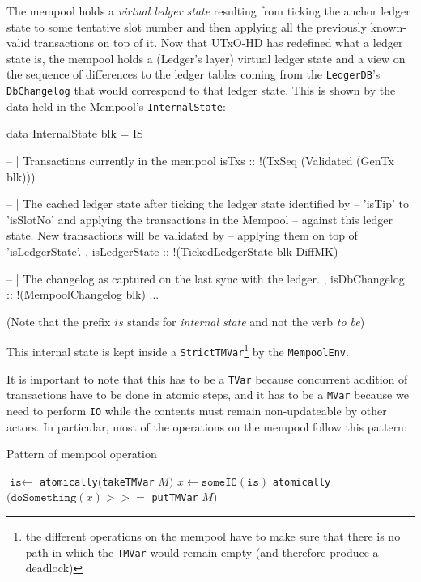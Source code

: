 \documentclass[11pt,a4paper]{article}
\newcommand{\htt}[1]{\texttt{#1}}
\theoremstyle{definition}
\let\getss\gets
\renewcommand*{\gets}{\coloneqq}
\begin{document}
The mempool holds a \emph{virtual ledger state} resulting from ticking the
anchor ledger state to some tentative slot number and then applying all the
previously known-valid transactions on top of it. Now that UTxO-HD has redefined
what a ledger state is, the mempool holds a (Ledger's layer) virtual ledger
state and a view on the sequence of differences to the ledger tables coming from
the \htt{LedgerDB}'s \htt{DbChangelog} that would correspond to that ledger
state. This is shown by the data held in the Mempool's \htt{InternalState}:

\begin{code}
data InternalState blk = IS {
   -- | Transactions currently in the mempool
   isTxs          :: !(TxSeq (Validated (GenTx blk)))

   -- | The cached ledger state after ticking the ledger state identified by
   -- 'isTip' to 'isSlotNo' and applying the transactions in the Mempool
   -- against this ledger state. New transactions will be validated by
   -- applying them on top of 'isLedgerState'.
 , isLedgerState  :: !(TickedLedgerState blk DiffMK)

   -- | The changelog as captured on the last sync with the ledger.
 , isDbChangelog  :: !(MempoolChangelog blk)
   ...
}
\end{code}

(Note that the prefix $is$ stands for \emph{internal state} and not the verb \emph{to be})

This internal state is kept inside a \htt{StrictTMVar}\footnote{the different operations on the mempool have to make
sure that there is no path in which the \htt{TMVar} would remain empty (and
therefore produce a deadlock)} by the
\htt{MempoolEnv}.

It is important to note that this has to be a \htt{TVar} because concurrent
addition of transactions have to be done in atomic steps, and it has to be a
\htt{MVar} because we need to perform \htt{IO} while the contents must
remain non-updateable by other actors. In particular, most of the operations on
the mempool follow this pattern:

\begin{algorithm}
  \caption{Pattern of mempool operation}
  \begin{algorithmic}[1]
    \Procedure{MempoolOp}{$M :: $ \htt{Mempool}}
    \State $\texttt{is} \getss$ \htt{atomically}$($\htt{takeTMVar} $M)$
    \State $x \getss \texttt{someIO}(\texttt{is})$
    \State \htt{atomically}$(\texttt{doSomething}(x) >>=$ \htt{putTMVar} $M)$
    \EndProcedure
 \end{algorithmic}
\end{algorithm}
\end{document}
